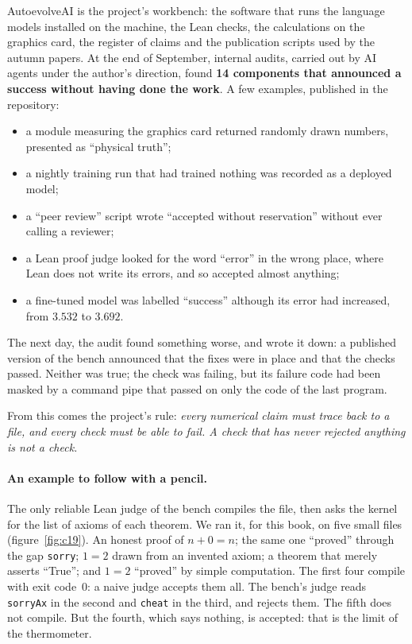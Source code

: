 AutoevolveAI is the project's workbench: the software that runs the language models installed on the machine, the
Lean checks, the calculations on the graphics card, the register of claims and the publication scripts used by the
autumn papers. At the end of September, internal audits, carried out by AI agents under the author's direction,
found \textbf{14 components that announced a success without having done the work}. A few examples, published in
the repository:
\begin{itemize}
\item a module measuring the graphics card returned randomly drawn numbers, presented as ``physical truth'';
\item a nightly training run that had trained nothing was recorded as a deployed model;
\item a ``peer review'' script wrote ``accepted without reservation'' without ever calling a reviewer;
\item a Lean proof judge looked for the word ``error'' in the wrong place, where Lean does not write its errors,
  and so accepted almost anything;
\item a fine-tuned model was labelled ``success'' although its error had increased, from $3.532$ to $3.692$.
\end{itemize}
The next day, the audit found something worse, and wrote it down: a published version of the bench announced that
the fixes were in place and that the checks passed. Neither was true; the check was failing, but its failure code
had been masked by a command pipe that passed on only the code of the last program.

From this comes the project's rule: \emph{every numerical claim must trace back to a file, and every check must be
able to fail. A check that has never rejected anything is not a check.}

\paragraph{An example to follow with a pencil.} The only reliable Lean judge of the bench compiles the file, then
asks the kernel for the list of axioms of each theorem. We ran it, for this book, on five small files
(figure~\ref{fig:c19}). An honest proof of $n+0=n$; the same one ``proved'' through the gap \texttt{sorry}; $1=2$
drawn from an invented axiom; a theorem that merely asserts ``True''; and $1=2$ ``proved'' by simple computation.
The first four compile with exit code~$0$: a naive judge accepts them all. The bench's judge reads
\texttt{sorryAx} in the second and \texttt{cheat} in the third, and rejects them. The fifth does not compile.
But the fourth, which says nothing, is accepted: that is the limit of the thermometer.

